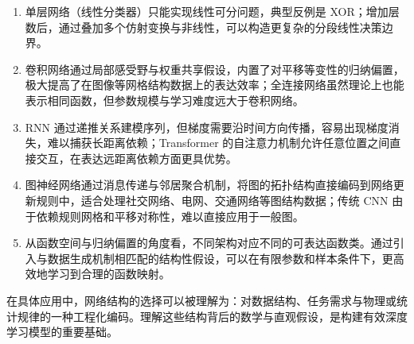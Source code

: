 \begin{enumerate}
\item 单层网络（线性分类器）只能实现线性可分问题，典型反例是 XOR；增加层数后，通过叠加多个仿射变换与非线性，可以构造更复杂的分段线性决策边界。

\item 卷积网络通过局部感受野与权重共享假设，内置了对平移等变性的归纳偏置，极大提高了在图像等网格结构数据上的表达效率；全连接网络虽然理论上也能表示相同函数，但参数规模与学习难度远大于卷积网络。

\item RNN 通过递推关系建模序列，但梯度需要沿时间方向传播，容易出现梯度消失，难以捕获长距离依赖；Transformer 的自注意力机制允许任意位置之间直接交互，在表达远距离依赖方面更具优势。

\item 图神经网络通过消息传递与邻居聚合机制，将图的拓扑结构直接编码到网络更新规则中，适合处理社交网络、电网、交通网络等图结构数据；传统 CNN 由于依赖规则网格和平移对称性，难以直接应用于一般图。

\item 从函数空间与归纳偏置的角度看，不同架构对应不同的可表达函数类。通过引入与数据生成机制相匹配的结构性假设，可以在有限参数和样本条件下，更高效地学习到合理的函数映射。
\end{enumerate}

在具体应用中，网络结构的选择可以被理解为：对数据结构、任务需求与物理或统计规律的一种工程化编码。理解这些结构背后的数学与直观假设，是构建有效深度学习模型的重要基础。